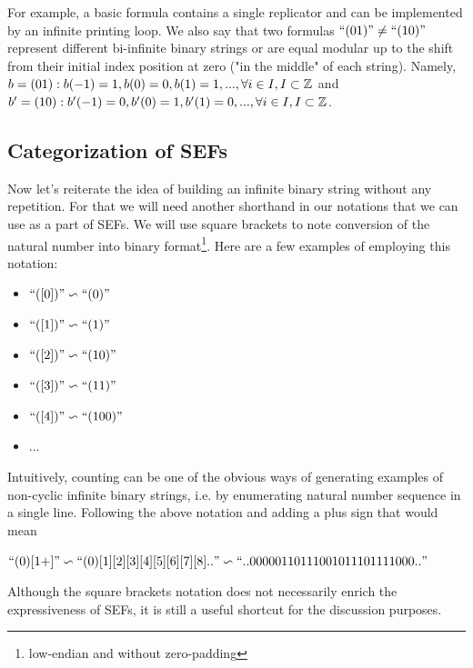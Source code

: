 For example, a basic formula contains a single replicator and can be implemented by an infinite printing loop. We also say that two formulas $\text{``}(01)\text{''} \neq \text{``}(10)\text{''}$ represent different bi-infinite binary strings or are equal modular up to the shift from their initial index position at zero ("in the middle" of each string). Namely, $b=(01): b(-1)= 1, b(0)=0, b(1)=1 , ... , \forall i \in I, I \subset \mathbb{Z}$ and $b^\prime=(10): b^\prime(-1)=0, b^\prime(0)=1, b^\prime(1)=0, ... , \forall i \in I, I \subset \mathbb{Z}$.



\subsection{Categorization of SEFs}

Now let's reiterate the idea of building an infinite binary string without any repetition. For that we will need another shorthand in our notations that we can use as a part of SEFs. We will use square brackets to note conversion of the natural number into binary format\footnote{low-endian and without zero-padding}. Here are a few examples of employing this notation:

\begin{itemize}
  \item $\text{``}([0])\text{''} \backsim \text{``}(0)\text{''}$
  \item $\text{``}([1])\text{''} \backsim \text{``}(1)\text{''}$
  \item $\text{``}([2])\text{''} \backsim \text{``}(10)\text{''}$
  \item $\text{``}([3])\text{''} \backsim \text{``}(11)\text{''}$
  \item $\text{``}([4])\text{''} \backsim \text{``}(100)\text{''}$
  \item ...
\end{itemize}

Intuitively, counting can be one of the obvious ways of generating examples of non-cyclic infinite binary strings, i.e. by enumerating natural number sequence in a single line. Following the above notation and adding a plus sign that would mean

\begin{center}$ \text{``}(0)[1+]\text{''} \backsim \text{``}(0)[1][2][3][4][5][6][7][8]..\text{''} \backsim \text{``}..00000110111001011101111000..\text{''}$\end{center}

Although the square brackets notation does not necessarily enrich the expressiveness of SEFs, it is still a useful shortcut for the discussion purposes.

